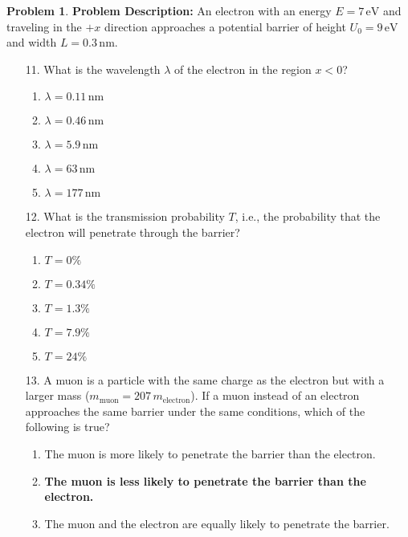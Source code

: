 \documentclass[12pt]{article}
\theoremstyle{definition} %
\newtheorem{problem}{Problem}
\theoremstyle{plain} %
\begin{document}
\begin{problem}
    
\textbf{Problem Description:}
An electron with an energy \(E = 7 \, \text{eV}\) and traveling in the \(+x\) direction approaches a potential barrier of height \(U_0 = 9 \, \text{eV}\) and width \(L = 0.3 \, \text{nm}\).

\begin{enumerate}
    \item[11.] What is the wavelength \(\lambda\) of the electron in the region \(x < 0\)?
    \begin{enumerate}
        \item \(\lambda = 0.11 \, \text{nm}\)
        \item \textbf{\(\lambda = 0.46 \, \text{nm}\)}
        \item \(\lambda = 5.9 \, \text{nm}\)
        \item \(\lambda = 63 \, \text{nm}\)
        \item \(\lambda = 177 \, \text{nm}\)
    \end{enumerate}
    
    \item[12.] What is the transmission probability \(T\), i.e., the probability that the electron will penetrate through the barrier?
    \begin{enumerate}
        \item \(T = 0\%\)
        \item \(T = 0.34\%\)
        \item \textbf{\(T = 1.3\%\)}
        \item \(T = 7.9\%\)
        \item \(T = 24\%\)
    \end{enumerate}

    \item[13.] A muon is a particle with the same charge as the electron but with a larger mass (\(m_{\text{muon}} = 207 \, m_{\text{electron}}\)). If a muon instead of an electron approaches the same barrier under the same conditions, which of the following is true?
    \begin{enumerate}
        \item The muon is more likely to penetrate the barrier than the electron.
        \item \textbf{The muon is less likely to penetrate the barrier than the electron.}
        \item The muon and the electron are equally likely to penetrate the barrier.
    \end{enumerate}
\end{enumerate}


\end{problem}
\end{document}
